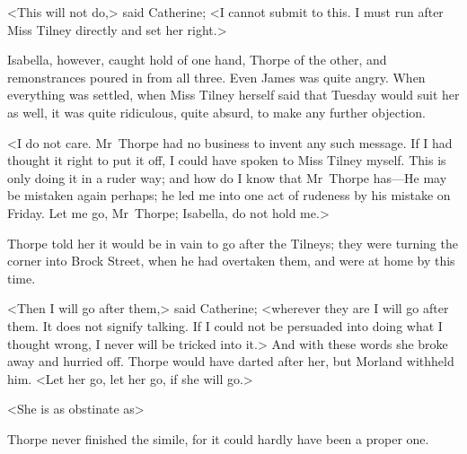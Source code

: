  <This will not do,> said Catherine; <I cannot submit to this. I must run after Miss Tilney directly and set her right.> 

 Isabella, however, caught hold of one hand, Thorpe of the other, and remonstrances poured in from all three. Even James was quite angry. When everything was settled, when Miss Tilney herself said that Tuesday would suit her as well, it was quite ridiculous, quite absurd, to make any further objection. 

 <I do not care. Mr~Thorpe had no business to invent any such message. If I had thought it right to put it off, I could have spoken to Miss Tilney myself. This is only doing it in a ruder way; and how do I know that Mr~Thorpe has—He may be mistaken again perhaps; he led me into one act of rudeness by his mistake on Friday. Let me go, Mr~Thorpe; Isabella, do not hold me.> 

 Thorpe told her it would be in vain to go after the Tilneys; they were turning the corner into Brock Street, when he had overtaken them, and were at home by this time. 

 <Then I will go after them,> said Catherine; <wherever they are I will go after them. It does not signify talking. If I could not be persuaded into doing what I thought wrong, I never will be tricked into it.> And with these words she broke away and hurried off. Thorpe would have darted after her, but Morland withheld him. <Let her go, let her go, if she will go.> 

 <She is as obstinate as\longdash> 

 Thorpe never finished the simile, for it could hardly have been a proper one. 

